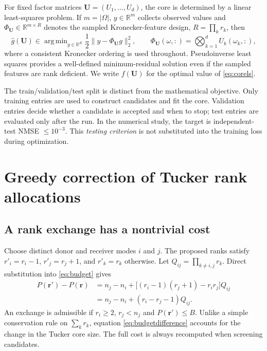 \documentclass[review,10pt]{elsarticle}
\DeclareMathOperator*{\argmin}{arg\,min}
\newcommand{\Om}{\Omega}
\newcommand{\R}{\mathbb R}
\begin{document}
For fixed factor matrices $\boldsymbol U=(U_1,\ldots,U_d)$, the core is determined by a linear least-squares problem. If $m=|\Om|$, $y\in\R^m$ collects observed values and $\Phi_{\boldsymbol U}\in\R^{m\times R}$ denotes the sampled Kronecker-feature design, $R=\prod_k r_k$, then
\begin{equation}\label{eq:corels}
\widehat g(\boldsymbol U)\in\argmin_{g\in\R^R}\frac12\|y-\Phi_{\boldsymbol U}g\|_2^2,
\qquad \Phi_{\boldsymbol U}(\omega,:)=\bigotimes_{k=1}^d U_k(\omega_k,:),
\end{equation}
where a consistent Kronecker ordering is used throughout. Pseudoinverse least squares provides a well-defined minimum-residual solution even if the sampled features are rank deficient. We write $f(\boldsymbol U)$ for the optimal value of \eqref{eq:corels}.

The train/validation/test split is distinct from the mathematical objective. Only training entries are used to construct candidates and fit the core. Validation entries decide whether a candidate is accepted and when to stop; test entries are evaluated only after the run. In the numerical study, the target is independent-test NMSE $\leq10^{-3}$. This \emph{testing criterion} is not substituted into the training loss during optimization.

\section{Greedy correction of Tucker rank allocations}\label{sec:method}
\subsection{A rank exchange has a nontrivial cost}\label{subsec:exchange}
Choose distinct donor and receiver modes $i$ and $j$. The proposed ranks satisfy $r'_i=r_i-1$, $r'_j=r_j+1$, and $r'_k=r_k$ otherwise. Let $Q_{ij}=\prod_{k\neq i,j}r_k$. Direct substitution into \eqref{eq:budget} gives
\begin{equation}\label{eq:budgetdifference}
\begin{split}
P(\boldsymbol r')-P(\boldsymbol r)
&=n_j-n_i+\big[(r_i-1)(r_j+1)-r_ir_j\big]Q_{ij}\\
&=n_j-n_i+(r_i-r_j-1)Q_{ij}.
\end{split}
\end{equation}
An exchange is admissible if $r_i\ge2$, $r_j<n_j$ and $P(\boldsymbol r')\le B$. Unlike a simple conservation rule on $\sum_k r_k$, equation \eqref{eq:budgetdifference} accounts for the change in the Tucker core size. The full cost is always recomputed when screening candidates.
\end{document}
